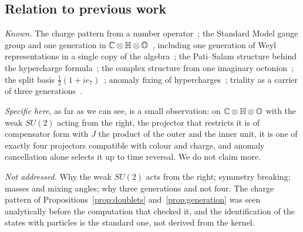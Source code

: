 \subsection{Relation to previous work}\label{subsec:gen-new}

\emph{Known.}  The charge pattern from a number operator~\cite{furey2015}; the Standard Model gauge group and one generation in
\(\mathbb C\otimes\mathbb H\otimes\mathbb O\)~\cite{dixon,furey2018,gresnigt}, including one generation of Weyl representations in a single copy of the
algebra~\cite{fureyhughes}; the Pati--Salam structure behind the hypercharge formula~\cite{baezhuerta}; the complex structure from one
imaginary octonion~\cite{krasnov}; the split basis \(\tfrac12(1+ie_7)\)~\cite{gunaydin}; anomaly fixing of hypercharges~\cite{gengmarshak,minahan};
triality as a carrier of three generations~\cite{boyle}.

\emph{Specific here}, as far as we can see, is a small observation: on \(\mathbb C\otimes\mathbb H\otimes\mathbb O\) with the weak \(SU(2)\) acting from the
right, the projector that restricts it is of compensator form with \(J\) the product of the outer and the inner unit, it is one of exactly four
projectors compatible with colour and charge, and anomaly cancellation alone selects it up to time reversal.  We do not claim more.

\emph{Not addressed.}  Why the weak \(SU(2)\) acts from the right; symmetry breaking; masses and mixing angles; why three generations and
not four.  The charge pattern of Propositions~\ref{prop:doublets} and~\ref{prop:generation} was seen analytically before the computation
that checked it, and the identification of the states with particles is the standard one, not derived from the kernel.
